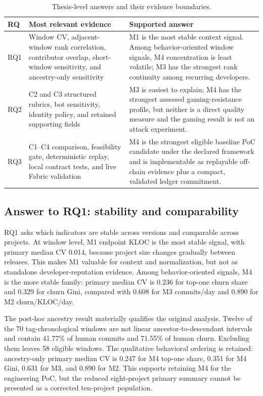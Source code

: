 \begin{table}[H]
\centering
\small
\renewcommand{\arraystretch}{1.08}
\begin{tabularx}{\textwidth}{p{1.1cm}p{4.5cm}X}
\toprule
\textbf{RQ} & \textbf{Most relevant evidence} & \textbf{Supported answer} \\
\midrule
RQ1 & Window CV, adjacent-window rank correlation, contributor overlap, short-window sensitivity, and ancestry-only sensitivity & M1 is the most stable context signal. Among behavior-oriented window signals, M4 concentration is least volatile; M3 has the strongest rank continuity among recurring developers. \\
RQ2 & C2 and C3 structured rubrics, bot sensitivity, identity policy, and retained supporting fields & M3 is easiest to explain; M4 has the strongest assessed gaming-resistance profile, but neither is a direct quality measure and the gaming result is not an attack experiment. \\
RQ3 & C1--C4 comparison, feasibility gate, deterministic replay, local contract tests, and live Fabric validation & M4 is the strongest eligible baseline PoC candidate under the declared framework and is implementable as replayable off-chain evidence plus a compact, validated ledger commitment. \\
\bottomrule
\end{tabularx}
\caption{Thesis-level answers and their evidence boundaries.}
\label{tab:final_rq_summary}
\end{table}

\subsection{Answer to RQ1: stability and comparability}
\label{sec:final_rq1}

RQ1 asks which indicators are stable across versions and comparable across projects. At window level, M1 endpoint KLOC is
the most stable signal, with primary median CV 0.014, because project size changes gradually between releases. This makes M1
valuable for context and normalization, but not as standalone developer-reputation evidence. Among behavior-oriented signals,
M4 is the more stable family: primary median CV is 0.236 for top-one churn share and 0.329 for churn Gini, compared with
0.608 for M3 commits/day and 0.890 for M2 churn/KLOC/day.

The post-hoc ancestry result materially qualifies the original analysis. Twelve of the 70 tag-chronological windows are not
linear ancestor-to-descendant intervals and contain 41.77\% of human commits and 71.55\% of human churn. Excluding them leaves
58 eligible windows. The qualitative behavioral ordering is retained: ancestry-only primary median CV is 0.247 for M4
top-one share, 0.351 for M4 Gini, 0.631 for M3, and 0.890 for M2. This supports retaining M4 for the engineering PoC, but the
reduced eight-project primary summary cannot be presented as a corrected ten-project population.

